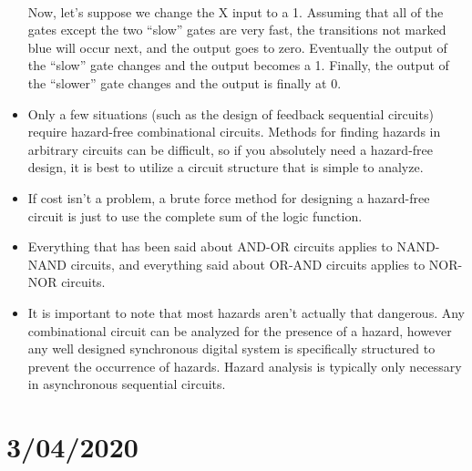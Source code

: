 \documentclass[10pt,a4paper]{article}
\begin{document}
\begin{itemize}
\\
Now, let's suppose we change the X input to a 1. Assuming that all of the gates except the two ``slow'' gates are very fast, the transitions not marked blue will occur next, and the output goes to zero. Eventually the output of the ``slow'' gate changes and the output becomes a 1. Finally, the output of the ``slower'' gate changes and the output is finally at 0. 
\item Only a few situations (such as the design of feedback sequential circuits) require hazard-free combinational circuits. Methods for finding hazards in arbitrary circuits can be difficult, so if you absolutely need a hazard-free design, it is best to utilize a circuit structure that is simple to analyze. 
\item If cost isn't a problem, a brute force method for designing a hazard-free circuit is just to use the complete sum of the logic function. 
\item Everything that has been said about AND-OR circuits applies to NAND-NAND circuits, and everything said about OR-AND circuits applies to NOR-NOR circuits.
\item It is important to note that most hazards aren't actually that dangerous. Any combinational circuit can be analyzed for the presence of a hazard, however any well designed synchronous digital system is specifically structured to prevent the occurrence of hazards. Hazard analysis is typically only necessary in asynchronous sequential circuits. 
\end{itemize}
\pagebreak
\section{3/04/2020}
\end{document}
